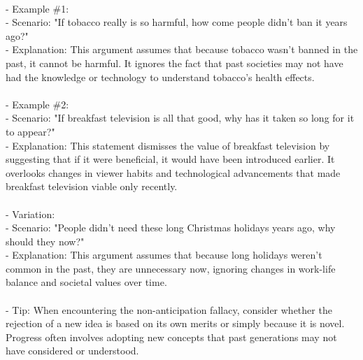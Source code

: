 \documentclass[a4paper,12pt,single,pdftex]{scrartcl}
\begin{document}
    
      
    \\

    
      - Example \#1:
    \\

    
        - Scenario: "If tobacco really is so harmful, how come people didn’t ban it years ago?"
    \\

    
        - Explanation: This argument assumes that because tobacco wasn't banned in the past, it cannot be harmful. It ignores the fact that past societies may not have had the knowledge or technology to understand tobacco's health effects.
    \\

    
      
    \\

    
      - Example \#2:
    \\

    
        - Scenario: "If breakfast television is all that good, why has it taken so long for it to appear?"
    \\

    
        - Explanation: This statement dismisses the value of breakfast television by suggesting that if it were beneficial, it would have been introduced earlier. It overlooks changes in viewer habits and technological advancements that made breakfast television viable only recently.
    \\

    
      
    \\

    
      - Variation: 
    \\

    
        - Scenario: "People didn’t need these long Christmas holidays years ago, why should they now?"
    \\

    
        - Explanation: This argument assumes that because long holidays weren't common in the past, they are unnecessary now, ignoring changes in work-life balance and societal values over time.
    \\

    
      
    \\

    
      - Tip: When encountering the non-anticipation fallacy, consider whether the rejection of a new idea is based on its own merits or simply because it is novel. Progress often involves adopting new concepts that past generations may not have considered or understood.
    \\
\end{document}

